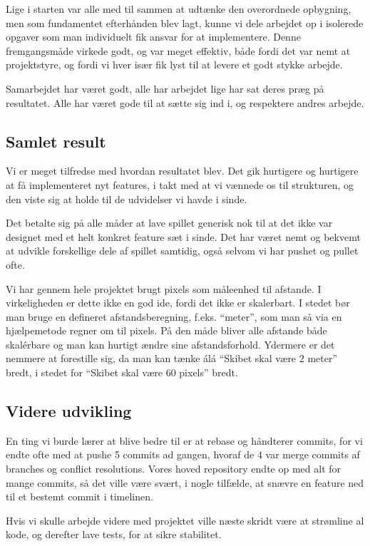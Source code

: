 \documentclass[titlepage,danish]{article}
\begin{document}
Lige i starten var alle med til sammen at udtænke den overordnede opbygning, men som fundamentet
efterhånden blev lagt, kunne vi dele arbejdet op i isolerede opgaver som man individuelt fik ansvar
for at implementere. Denne fremgangsmåde virkede godt, og var meget effektiv, både fordi det var
nemt at projektstyre, og fordi vi hver især fik lyst til at levere et godt stykke arbejde.

Samarbejdet har været godt, alle har arbejdet lige har sat deres præg på resultatet. Alle har været
gode til at sætte sig ind i, og respektere andres arbejde.

\subsection{Samlet result}
Vi er meget tilfredse med hvordan resultatet blev. Det gik hurtigere og hurtigere at få
implementeret nyt features, i takt med at vi vænnede os til strukturen, og den viste sig at holde
til de udvidelser vi havde i sinde.

Det betalte sig på alle måder at lave spillet generisk nok til at det ikke var designet med et helt
konkret feature sæt i sinde. Det har været nemt og bekvemt at udvikle forskellige dele af spillet
samtidig, også selvom vi har pushet og pullet ofte. 

Vi har gennem hele projektet brugt pixels som måleenhed til afstande. I virkeligheden er dette ikke
en god ide, fordi det ikke er skalerbart. I stedet bør man bruge en defineret afstandsberegning,
f.eks. ``meter'', som man så via en hjælpemetode regner om til pixels. På den måde bliver alle
afstande både skalérbare og man kan hurtigt ændre sine afstandsforhold. Ydermere er det nemmere at
forestille sig, da man kan tænke álá ``Skibet skal være 2 meter'' bredt, i stedet for ``Skibet skal
være 60 pixels'' bredt.

\subsection{Videre udvikling}
En ting vi burde lærer at blive bedre til er at rebase og håndterer commits, for vi endte ofte med
at pushe 5 commits ad gangen, hvoraf de 4 var merge commits af branches og conflict
resolutions. Vores hoved repository endte op med alt for mange commits, så det ville være svært, i
nogle tilfælde, at snævre en feature ned til et bestemt commit i timelinen.

Hvis vi skulle arbejde videre med projektet ville næste skridt være at strømline al kode, og
derefter lave tests, for at sikre stabilitet.
\end{document}
